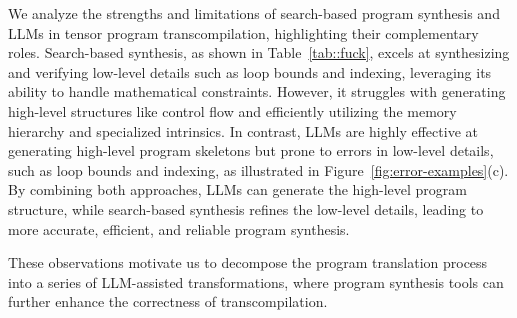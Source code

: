 We analyze the strengths and limitations of search-based program synthesis and LLMs in tensor program transcompilation, highlighting their complementary roles.
Search-based synthesis, as shown in Table~\ref{tab::fuck}, excels at synthesizing and verifying low-level details such as loop bounds and indexing, leveraging its ability to handle mathematical constraints. However, it struggles with generating high-level structures like control flow and efficiently utilizing the memory hierarchy and specialized intrinsics. In contrast, LLMs are highly effective at generating high-level program skeletons but prone to errors in low-level details, such as loop bounds and indexing, as illustrated in Figure~\ref{fig:error-examples}(c).
By combining both approaches, LLMs can generate the high-level program structure, while search-based synthesis refines the low-level details, leading to more accurate, efficient, and reliable program synthesis.

These observations motivate us to decompose the program translation process into a series of LLM-assisted transformations, where program synthesis tools can further enhance the correctness of transcompilation.
